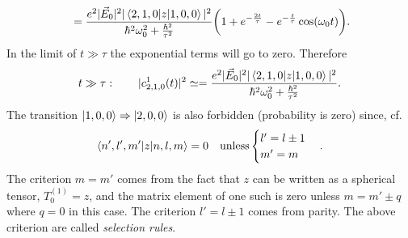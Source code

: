 \begin{example}
\begin{equation}
\begin{split}
			&=\frac{e^2|\vec{E}_0|^2|\braket{2,1,0|z|1,0,0}|^2}{\hbar^2\omega_{0}^2+\frac{\hbar^2}{\tau^2}}\bigg(1+e^{-\frac{2t}{\tau}}-e^{-\frac{t}{\tau}}\cos(\omega_0t)\bigg).\\
		\end{split}
	\end{equation} 
	In the limit of $t\gg\tau$ the exponential terms will go to zero. Therefore
	\begin{equation}
		\begin{split}
			t\gg\tau:\qquad|c^1_{2,1,0}(t)|^2\simeq=\frac{e^2|\vec{E}_0|^2|\braket{2,1,0|z|1,0,0}|^2}{\hbar^2\omega_{0}^2+\frac{\hbar^2}{\tau^2}}.\\
		\end{split}
	\end{equation} 
	The transition $\ket{1,0,0}\Rightarrow \ket{2,0,0}$ is also forbidden (probability is zero) since, cf.~\citep[p.322]{Sakurai}
	\begin{equation}
		\braket{n',l',m'|z|n,l,m}=0 \quad \mbox{unless} \begin{cases}
			l'=l\pm1 \\ m'=m
		\end{cases}.
	\end{equation} 
	The criterion $m=m'$ comes from the fact that $z$ can be written as a spherical tensor, $T_{0}^{(1)}=z$, and the matrix element of one such is zero unless $m=m'\pm q$ where $q=0$ in this case. The criterion $l'=l\pm1$ comes from parity. The above criterion are called \emph{selection rules}. 
\end{example}

